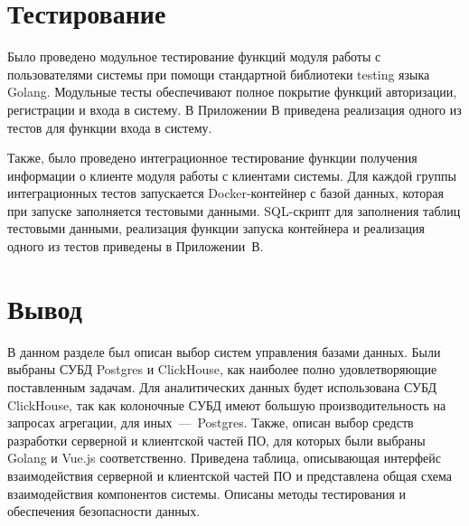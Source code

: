 %
%
%
%

\section{Тестирование}

Было проведено модульное тестирование функций модуля работы с пользователями системы при помощи стандартной библиотеки testing языка Golang. Модульные тесты обеспечивают полное покрытие функций авторизации, регистрации и входа в систему. В Приложении В приведена реализация одного из тестов для функции входа в систему.

Также, было проведено интеграционное тестирование функции получения информации о клиенте модуля работы с клиентами системы. Для каждой группы интеграционных тестов запускается Docker-контейнер с базой данных, которая при запуске заполняется тестовыми данными. SQL-скрипт для заполнения таблиц тестовыми данными, реализация функции запуска контейнера и реализация одного из тестов приведены в Приложении~В.

\section{Вывод}
В данном разделе был описан выбор систем управления базами данных. Были выбраны СУБД Postgres и ClickHouse, как наиболее полно удовлетворяющие поставленным задачам. Для аналитических данных будет использована СУБД ClickHouse, так как колоночные СУБД имеют большую производительность на запросах агрегации, для иных~---~Postgres. Также, описан выбор средств разработки серверной и клиентской частей ПО, для которых были выбраны Golang и Vue.js соответственно. Приведена таблица, описывающая интерфейс взаимодействия серверной и клиентской частей ПО и представлена общая схема взаимодействия компонентов системы. Описаны методы тестирования и обеспечения безопасности данных.







